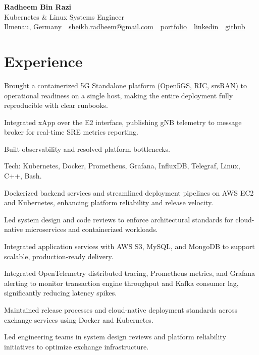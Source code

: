 \documentclass[10pt,a4paper]{resume}
\makeatletter
\newcommand{\Portfolio}{https://radheem.github.io/my-cv}
\newcommand{\PortfolioText}{portfolio}
\newcommand{\GitHub}{https://github.com/radheem}
\newcommand{\LinkedIn}{https://www.linkedin.com/in/radheem-razi}
\newcommand{\Email}{sheikh.radheem@gmail.com}
\makeatother
\begin{document}
\begin{center}
  {\huge\bfseries Radheem Bin Razi}\\[3pt]
  {\large Kubernetes \& Linux Systems Engineer}\\[6pt]
  \small
  Ilmenau, Germany \,\textbar\,
  \href{mailto:\Email}{\Email} \,\textbar\,
  \href{\Portfolio}{\PortfolioText} \,\textbar\,
  \href{\LinkedIn}{linkedin} \,\textbar\,
  \href{\GitHub}{github}
\end{center}
\vspace{2pt}

\section{Experience}

\bullets
  \item Brought a containerized 5G Standalone platform (Open5GS, RIC, srsRAN) to operational readiness on a single host, making the entire deployment fully reproducible with clear runbooks.
  \item Integrated xApp over the E2 interface, publishing gNB telemetry to message broker for real-time SRE metrics reporting.
  \item Built observability and resolved platform bottlenecks.
  \item Tech: Kubernetes, Docker, Prometheus, Grafana, InfluxDB, Telegraf, Linux, C++, Bash.
\bulletsend
\vspace{1.5pt}
\bullets
  \item Dockerized backend services and streamlined deployment pipelines on AWS EC2 and Kubernetes, enhancing platform reliability and release velocity.
  \item Led system design and code reviews to enforce architectural standards for cloud-native microservices and containerized workloads.
  \item Integrated application services with AWS S3, MySQL, and MongoDB to support scalable, production-ready delivery.
\bulletsend
\vspace{1.5pt}
\bullets
  \item Integrated OpenTelemetry distributed tracing, Prometheus metrics, and Grafana alerting to monitor transaction engine throughput and Kafka consumer lag, significantly reducing latency spikes.
  \item Maintained release processes and cloud-native deployment standards across exchange services using Docker and Kubernetes.
  \item Led engineering teams in system design reviews and platform reliability initiatives to optimize exchange infrastructure.
\bulletsend
\vspace{1.5pt}
\end{document}
